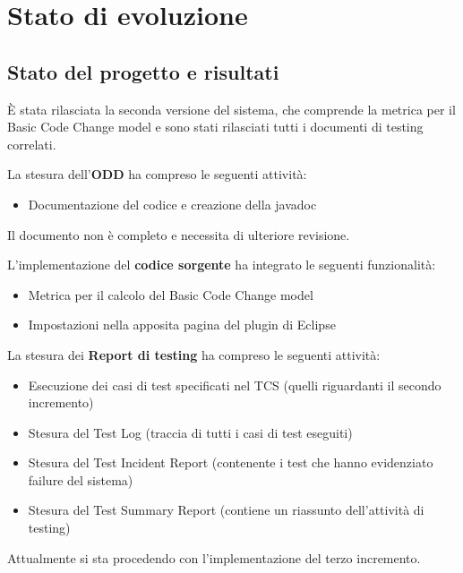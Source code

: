 \chapter{Stato di evoluzione}
\section{Stato del progetto e risultati}
È stata rilasciata la seconda versione del sistema, che comprende la metrica per il Basic Code Change model e sono stati rilasciati tutti i documenti di testing correlati.

\vspace{0.5cm}

{\setlength{\parindent}{0cm}
La stesura dell'\textbf{ODD} ha compreso le seguenti attività:
\begin{itemize}
 \item Documentazione del codice e creazione della javadoc
\end{itemize}
Il documento non è completo e necessita di ulteriore revisione.
}

\vspace{0.5cm}

{\setlength{\parindent}{0cm}
L'implementazione del \textbf{codice sorgente} ha integrato le seguenti funzionalità:
\begin{itemize}
 \item Metrica per il calcolo del Basic Code Change model
 \item Impostazioni nella apposita pagina del plugin di Eclipse
\end{itemize}
}

\vspace{0.5cm}

{\setlength{\parindent}{0cm}
La stesura dei \textbf{Report di testing} ha compreso le seguenti attività:
\begin{itemize}
 \item Esecuzione dei casi di test specificati nel TCS (quelli riguardanti il secondo incremento)
 \item Stesura del Test Log (traccia di tutti i casi di test eseguiti)
 \item Stesura del Test Incident Report (contenente i test che hanno evidenziato failure del sistema)
 \item Stesura del Test Summary Report (contiene un riassunto dell'attività di testing)
\end{itemize}
}

Attualmente si sta procedendo con l'implementazione del terzo incremento.